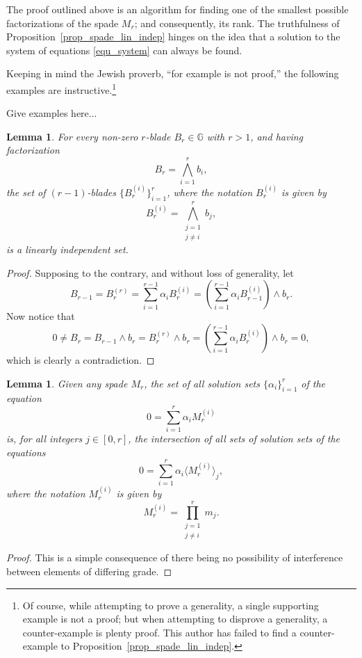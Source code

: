 \documentclass{birkjour}
\newtheorem{lem}[thm]{Lemma}
\theoremstyle{definition}
\theoremstyle{remark}
\numberwithin{equation}{section}
\newcommand{\G}{\mathbb{G}}
\begin{document}
The proof outlined above is an algorithm for finding one of the smallest possible factorizations of the spade $M_r$; and consequently, its rank.  The truthfulness of Proposition~\ref{prop_spade_lin_indep} hinges on the idea
that a solution to the system of equations \eqref{equ_system} can always be found.

Keeping in mind the Jewish proverb, ``for example is not proof,'' the following examples are instructive.\footnote{Of course, while attempting to prove a generality,
a single supporting example is not a proof; but when attempting to disprove a generality, a counter-example is plenty proof.  This author has failed to find
a counter-example to Proposition~\ref{prop_spade_lin_indep}.}

Give examples here...

\begin{lem}\label{lem_lin_indep_subblades}
For every non-zero $r$-blade $B_r\in\G$ with $r>1$, and having factorization
\begin{equation*}
B_r = \bigwedge_{i=1}^r b_i,
\end{equation*}
the set of $(r-1)$-blades $\{B_r^{(i)}\}_{i=1}^r$, where the notation $B_r^{(i)}$ is given by
\begin{equation*}
B_r^{(i)}=\bigwedge_{\substack{j=1\\j\neq i}}^r b_j,
\end{equation*}
is a linearly independent set.
\end{lem}
\begin{proof}
Supposing to the contrary, and without loss of generality, let
\begin{equation*}
B_{r-1} = B_r^{(r)} = \sum_{i=1}^{r-1}\alpha_i B_r^{(i)} = \left(\sum_{i=1}^{r-1}\alpha_i B_{r-1}^{(i)}\right)\wedge b_r.
\end{equation*}
Now notice that
\begin{equation*}
0\neq B_r = B_{r-1}\wedge b_r = B_r^{(r)}\wedge b_r = \left(\sum_{i=1}^{r-1}\alpha_i B_r^{(i)}\right)\wedge b_r = 0,
\end{equation*}
which is clearly a contradiction.
\end{proof}

\begin{lem}\label{lem_solution_intersection}
Given any spade $M_r$, the set of all solution sets $\{\alpha_i\}_{i=1}^r$ of the equation
\begin{equation*}
0 = \sum_{i=1}^r\alpha_i M_r^{(i)}
\end{equation*}
is, for all integers $j\in[0,r]$, the intersection of all sets of solution sets of the equations
\begin{equation*}
0 = \sum_{i=1}^r\alpha_i\langle M_r^{(i)}\rangle_j,
\end{equation*}
where the notation $M_r^{(i)}$ is given by
\begin{equation*}
M_r^{(i)}=\prod_{\substack{j=1\\j\neq i}}^r m_j.
\end{equation*}
\end{lem}
\begin{proof}
This is a simple consequence of there being no possibility of interference between elements of differing grade.
\end{proof}
\end{document}
